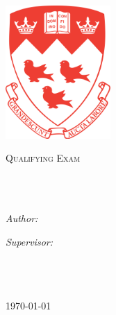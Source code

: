 \documentclass[
11pt, %
oneside, %
english, %
doublespacing, %
headsepline, %
chapterinoneline, %
]{MastersDoctoralThesis} %
\author{Luke \textsc{Anderson-Trocm\'e}} %
\begin{document}
\frontmatter %

\pagestyle{plain} %


\begin{titlepage}
\begin{center}

\includegraphics[width=40mm]{./Figures/McGill.png} %

\vspace*{.06\textheight}
{\scshape\LARGE \univname\par}\vspace{1.5cm} %
\textsc{\Large Qualifying Exam}\\[0.5cm] %

\HRule \\[0.4cm] %
{\huge \bfseries \ttitle\par}\vspace{0.4cm} %
\HRule \\[1.5cm] %
 
\begin{minipage}[t]{0.4\textwidth}
\begin{flushleft} \large
\emph{Author:}\\
{\authorname} %
\end{flushleft}
\end{minipage}
\begin{minipage}[t]{0.4\textwidth}
\begin{flushright} \large
\emph{Supervisor:} \\
{\supname} %
\end{flushright}
\end{minipage}\\[3cm]

\deptname\\\facname\\[2cm] %

{\large \today}\\[4cm] %

\vfill
\end{center}
\end{titlepage}
\end{document}
